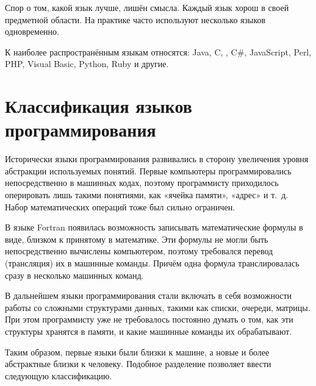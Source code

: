 Спор о том, какой язык лучше, лишён смысла. Каждый язык хорош в своей
предметной области. На практике часто используют несколько языков
одновременно.

К наиболее распространённым языкам относятся: Java, C, \CPP, C\#,
JavaScript, Perl, PHP, Visual Basic, Python, Ruby и другие.

\section{Классификация языков программирования}


Исторически языки программирования развивались в сторону увеличения
уровня абстракции используемых понятий. Первые компьютеры
программировались непосредственно в машинных кодах, поэтому
программисту приходилось оперировать лишь такими понятиями, как
«ячейка памяти», «адрес» и т.~д. Набор математических операций тоже
был сильно ограничен.

В языке Fortran появилась возможность записывать математические
формулы в виде, близком к принятому в математике. Эти формулы не могли
быть непосредственно вычислены компьютером, поэтому требовался перевод
(трансляция) их в машинные команды. Причём одна формула
транслировалась сразу в несколько машинных команд.

В дальнейшем языки программирования стали включать в себя возможности
работы со сложными структурами данных, такими как списки, очереди,
матрицы. При этом программисту уже не требовалось постоянно думать о
том, как эти структуры хранятся в памяти, и какие машинные команды их
обрабатывают.

Таким образом, первые языки были близки к машине, а новые и более
абстрактные близки к человеку. Подобное разделение позволяет ввести
следующую классификацию.

